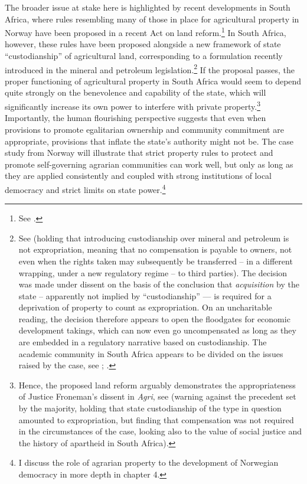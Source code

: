 The broader issue at stake here is highlighted by recent developments in South Africa, where rules resembling many of those in place for agricultural property in Norway have been proposed in a recent Act on land reform.\footnote{See \cite{steyn15}.} In South Africa, however, these rules have been proposed alongside a new framework of state ``custodianship'' of agricultural land, corresponding to a formulation recently introduced in the mineral and petroleum legislation.\footnote{See \cite{agri13} (holding that introducing custodianship over mineral and petroleum is not expropriation, meaning that no compensation is payable to owners, not even when the rights taken may subsequently be transferred --  in a different wrapping, under a new regulatory regime -- to third parties). The decision was made under dissent on the basis of the conclusion that {\it acquisition} by the state -- apparently not implied by ``custodianship'' --- is required for a deprivation of property to count as expropriation. On an uncharitable reading, the decision therefore appears to open the floodgates for economic development takings, which can now even go uncompensated as long as they are embedded in a regulatory narrative based on custodianship. The academic community in South Africa appears to be divided on the issues raised by the case, see \cite[428-451]{walt11}; \cite{marais15a,marais15b}.} If the proposal passes, the proper functioning of agricultural property in South Africa would seem to depend quite strongly on the benevolence and capability of the state, which will significantly increase its own power to interfere with private property.\footnote{Hence, the proposed land reform arguably demonstrates the appropriateness of Justice Froneman's dissent in {\it Agri}, see \cite[79-110]{agri13} (warning against the precedent set by the majority, holding that state custodianship of the type in question amounted to expropriation, but finding that compensation was not required in the circumstances of the case, looking also to the value of social justice and the history of apartheid in South Africa).} Importantly, the human flourishing perspective suggests that even when provisions to promote egalitarian ownership and community commitment are appropriate, provisions that inflate the state's authority might not be. The case study from Norway will illustrate that strict property rules to protect and promote self-governing agrarian communities can work well, but only as long as they are applied consistently and coupled with strong institutions of local democracy and strict limits on state power.\footnote{I discuss the role of agrarian property to the development of Norwegian democracy in more depth in chapter 4.}

